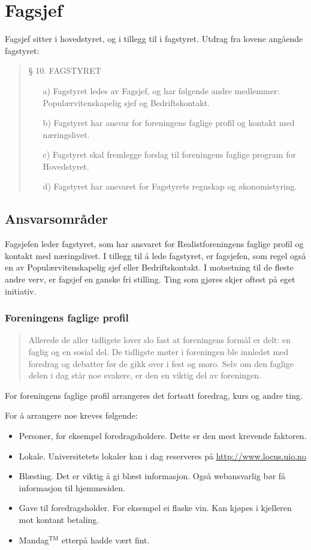 %
\section{Fagsjef}
Fagsjef sitter i hovedstyret, og i tillegg til i fagstyret. Utdrag fra lovene 
angående fagstyret:
\begin{quote}
§ 10. FAGSTYRET 
\begin{itemize}
	\item[a)] Fagstyret ledes av Fagsjef, og har følgende andre medlemmer: 
		Populærvitenskapelig sjef og Bedriftskontakt.
	\item[b)] Fagstyret har ansvar for foreningens faglige profil og 
		kontakt med næringslivet.
	\item[c)] Fagstyret skal fremlegge forslag til foreningens faglige 
		program for Hovedstyret.
	\item[d)] Fagstyret har ansvaret for Fagstyrets regnskap og 
		økonomistyring.
\end{itemize}
\end{quote}

\subsection{Ansvarsområder}
Fagsjefen leder fagstyret, som har ansvaret for Realistforeningens faglige
profil og kontakt med næringslivet. I tillegg til å lede fagstyret, er
fagsjefen, som regel også en av Populærvitenskapelig sjef eller Bedriftskontakt.
I motsetning til de fleste andre verv, er fagsjef en ganske fri stilling. Ting
som gjøres skjer oftest på eget initiativ.

\subsubsection{Foreningens faglige profil}
\begin{quote}
	Allerede de aller tidligste lover slo fast at foreningens formål er delt: en
	faglig og en sosial del. De tidligste møter i foreningen ble innledet
	med foredrag og debatter før de gikk over i fest og moro. Selv om den
	faglige delen i dag står noe svakere, er den en viktig del av
	foreningen.
\end{quote}
For foreningens faglige profil arrangeres det fortsatt foredrag, kurs og andre
ting.

For å arrangere noe kreves følgende:
\begin{itemize}
	\item Personer, for eksempel foredragsholdere. Dette er den mest
	krevende faktoren.
	\item Lokale. Universitetets lokaler kan i dag reserveres på
	\url{http://www.locus.uio.no}
	\item Blæsting. Det er viktig å gi blæst informasjon. Også webansvarlig
	bør få informasjon til hjemmesiden.
	\item Gave til foredragsholder. For eksempel ei flaske vin. Kan kjøpes i
	kjelleren mot kontant betaling.
	\item Mandag$^\text{TM}$ etterpå hadde vært fint.
\end{itemize}

